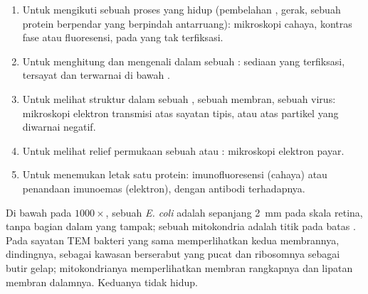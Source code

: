 \begin{method}\label{met:b1:cell-unit-of-life:choose}
\begin{enumerate}
  \item Untuk mengikuti sebuah proses yang hidup (pembelahan , gerak,
        sebuah protein berpendar yang berpindah antarruang): mikroskopi
        cahaya, kontras fase atau fluoresensi, pada  yang tak
        terfiksasi.
  \item Untuk menghitung dan mengenali  dalam sebuah :
        sediaan yang terfiksasi, tersayat dan terwarnai di bawah
        .
  \item Untuk melihat struktur dalam sebuah , sebuah membran,
        sebuah virus: mikroskopi elektron transmisi atas sayatan tipis,
        atau atas partikel yang diwarnai negatif.
  \item Untuk melihat relief permukaan sebuah  atau :
        mikroskopi elektron payar.
  \item Untuk menemukan letak satu protein: imunofluoresensi (cahaya)
        atau penandaan imunoemas (elektron), dengan antibodi terhadapnya.
\end{enumerate}
\end{method}

\begin{example}\label{ex:b1:cell-unit-of-life:seeing}
Di bawah  pada $1000\times$, sebuah  \emph{E. coli}
adalah  sepanjang \qty{2}{mm} pada skala retina, tanpa bagian
dalam yang tampak; sebuah mitokondria adalah titik pada batas . Pada sayatan TEM bakteri yang sama memperlihatkan kedua
membrannya, dindingnya,  sebagai kawasan berserabut yang
pucat dan ribosomnya sebagai butir gelap; mitokondrianya memperlihatkan
membran rangkapnya dan lipatan membran dalamnya. Keduanya tidak hidup.
\end{example}

